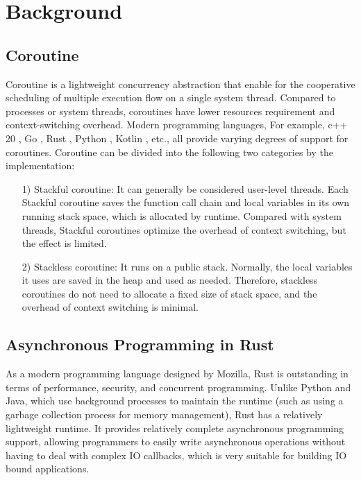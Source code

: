 \documentclass[sigconf,review,anonymous]{acmart}
\begin{document}
\section{Background}

\subsection{Coroutine}

Coroutine is a lightweight concurrency abstraction that enable for the cooperative scheduling of multiple execution flow on a single system thread. Compared to processes or system threads, coroutines have lower resources requirement and context-switching overhead. Modern programming languages, For example, c++ 20 \cite{C++20-coroutine}, Go \cite{goroutines}, Rust \cite{rosendahl2017green}, Python \cite{python-coroutine}, Kotlin \cite{kotlin-coroutines}, etc., all provide varying degrees of support for coroutines. Coroutine can be divided into the following two categories by the implementation:

\begin{itemize}[leftmargin=*]
    \item[1)] Stackful coroutine: It can generally be considered user-level threads. Each Stackful coroutine saves the function call chain and local variables in its own running stack space, which is allocated by runtime. Compared with system threads, Stackful coroutines optimize the overhead of context switching, but the effect is limited.
    \item[2)] Stackless coroutine: It runs on a public stack. Normally, the local variables it uses are saved in the heap and used as needed. Therefore, stackless coroutines do not need to allocate a fixed size of stack space, and the overhead of context switching is minimal.
\end{itemize}

\subsection{Asynchronous Programming in Rust}
\label{subsection: rust_async}

As a modern programming language designed by Mozilla, Rust is outstanding in terms of performance, security, and concurrent programming. Unlike Python and Java, which use background processes to maintain the runtime (such as using a garbage collection process for memory management), Rust has a relatively lightweight runtime. It provides relatively complete asynchronous programming support, allowing programmers to easily write asynchronous operations without having to deal with complex IO callbacks, which is very suitable for building IO bound applications.
\end{document}

